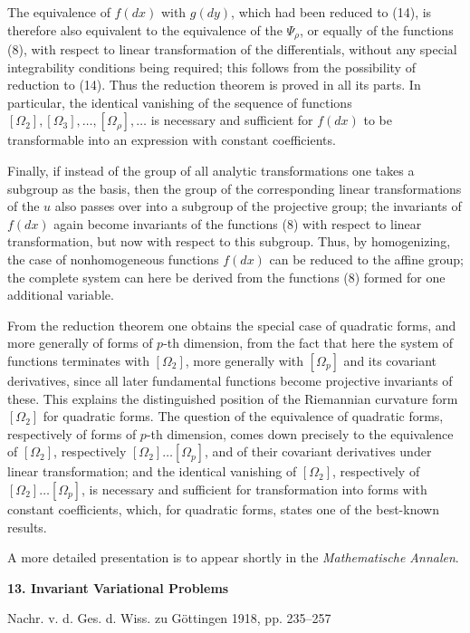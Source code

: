 \documentclass[11pt]{article}
\begin{document}
The equivalence of \(f(dx)\) with \(g(dy)\), which had been reduced to
(14), is therefore also equivalent to the equivalence of the
\(\Psi_\rho\), or equally of the functions (8), with respect to linear
transformation of the differentials, without any special integrability
conditions being required; this follows from the possibility of reduction
to (14). Thus the reduction theorem is proved in all its parts. In
particular, the identical vanishing of the sequence of functions
\([\Omega_2],[\Omega_3],\ldots,[\Omega_\rho],\ldots\) is necessary and
sufficient for \(f(dx)\) to be transformable into an expression with
constant coefficients.

Finally, if instead of the group of all analytic transformations one
takes a subgroup as the basis, then the group of the corresponding linear
transformations of the \(u\) also passes over into a subgroup of the
projective group; the invariants of \(f(dx)\) again become invariants of
the functions (8) with respect to linear transformation, but now with
respect to this subgroup. Thus, by homogenizing, the case of
nonhomogeneous functions \(f(dx)\) can be reduced to the affine group;
the complete system can here be derived from the functions (8) formed for
one additional variable.

From the reduction theorem one obtains the special case of quadratic
forms, and more generally of forms of \(p\)-th dimension, from the fact
that here the system of functions terminates with \([\Omega_2]\), more
generally with \([\Omega_p]\) and its covariant derivatives, since all
later fundamental functions become projective invariants of these. This
explains the distinguished position of the Riemannian curvature form
\([\Omega_2]\) for quadratic forms. The question of the equivalence of
quadratic forms, respectively of forms of \(p\)-th dimension, comes down
precisely to the equivalence of \([\Omega_2]\), respectively
\([\Omega_2]\ldots[\Omega_p]\), and of their covariant derivatives under
linear transformation; and the identical vanishing of \([\Omega_2]\),
respectively of \([\Omega_2]\ldots[\Omega_p]\), is necessary and
sufficient for transformation into forms with constant coefficients,
which, for quadratic forms, states one of the best-known results.

A more detailed presentation is to appear shortly in the
\emph{Mathematische Annalen}.

\begin{center}
{\Large\bfseries 13. Invariant Variational Problems}\par
\vspace{1.5em}
Nachr. v. d. Ges. d. Wiss. zu Göttingen 1918, pp. 235--257
\end{center}
\end{document}
